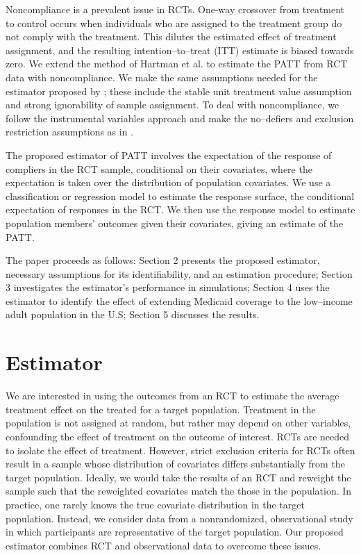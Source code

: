 \documentclass[12pt]{article}
\begin{document}
Noncompliance is a prevalent issue in RCTs.  One-way crossover from treatment to control occurs when individuals who are assigned to the treatment group do not comply with the treatment.  This dilutes the estimated effect of treatment assignment, and the resulting intention--to--treat (ITT) estimate is biased towards zero.  We extend the method of Hartman et al. to estimate the PATT from RCT data with noncompliance.  We make the same assumptions needed for the estimator proposed by \cite{Hartman}; these include the stable unit treatment value assumption and strong ignorability of sample assignment.  To deal with noncompliance, we follow the instrumental variables approach and make the no--defiers and exclusion restriction assumptions as in \cite{Angrist1996}. 

The proposed estimator of PATT involves the expectation of the response of compliers in the RCT sample, conditional on their covariates, where the expectation is taken over the distribution of population covariates.  We use a classification or regression model to estimate the response surface, the conditional expectation of responses in the RCT.  We then use the response model to estimate population members' outcomes given their covariates, giving an estimate of the PATT. 

The paper proceeds as follows: Section 2 presents the proposed estimator, necessary assumptions for its identifiability, and an estimation procedure; Section 3 investigates the estimator's performance in simulations; Section 4 uses the estimator to identify the effect of extending Medicaid coverage to the low--income adult population in the U.S; Section 5 discusses the results. 

\section{Estimator} \label{estimator}
We are interested in using the outcomes from an RCT to estimate the average treatment effect on the treated for a target population.  Treatment in the population is not assigned at random, but rather may depend on other variables, confounding the effect of treatment on the outcome of interest. RCTs are needed to isolate the effect of treatment. However, strict exclusion criteria for RCTs often result in a sample whose distribution of covariates differs substantially from the target population.  Ideally, we would take the results of an RCT and reweight the sample such that the reweighted covariates match the those in the population. In practice, one rarely knows the true covariate distribution in the target population.  Instead, we consider data from a nonrandomized, observational study in which participants are representative of the target population.  Our proposed estimator combines RCT and observational data to overcome these issues.
\end{document}
